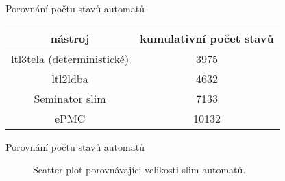 \documentclass[
]{beamer}
\newcommand{\hlineny}{\hline}
\begin{document}
	\begin{frame}{Porovnání počtu stavů automatů}
		\begin{table}[ht]
			\centering
			
		
		
		\begin{tabular}{|c||c|}
			\hline
			nástroj  &   kumulativní počet stavů \\
			\hline
			\hline
			
			ltl3tela (deterministické)&  	3975\\\hlineny
			ltl2ldba      &        4632 \\\hlineny
			\alert{Seminator slim}         &        \alert{7133} \\\hline
			ePMC     &     10132 \\\hline
			
			
			
		\end{tabular}
\end{table}
	\end{frame}
	\begin{frame}{Porovnání počtu stavů automatů}
		\begin{figure}[ht]
			\centering
			
			\caption{Scatter plot porovnávajíci velikosti slim automatů. }
			\label{scatter:slim-epmc}
			\begin{tikzpicture}
				
			\end{tikzpicture}
		\end{figure}
	\end{frame}
	
\end{document}
